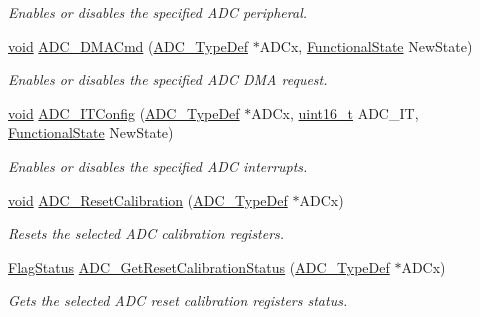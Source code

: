\begin{DoxyCompactItemize}
\begin{DoxyCompactList}\small\item\em Enables or disables the specified A\+DC peripheral. \end{DoxyCompactList}\item 
\hyperlink{usb__devapi_8h_afabf60e7f57651d6d595a02c75f07cd0}{void} \hyperlink{group___a_d_c___private___functions_gac5881d5995818001584b27b137a8dbcb}{A\+D\+C\+\_\+\+D\+M\+A\+Cmd} (\hyperlink{struct_a_d_c___type_def}{A\+D\+C\+\_\+\+Type\+Def} $\ast$A\+D\+Cx, \hyperlink{agilefox_2library_2inc_2stm32f10x__type_8h_ac9a7e9a35d2513ec15c3b537aaa4fba1}{Functional\+State} New\+State)
\begin{DoxyCompactList}\small\item\em Enables or disables the specified A\+DC D\+MA request. \end{DoxyCompactList}\item 
\hyperlink{usb__devapi_8h_afabf60e7f57651d6d595a02c75f07cd0}{void} \hyperlink{group___a_d_c___private___functions_gad4c84b54b539944f555488bf979f82b6}{A\+D\+C\+\_\+\+I\+T\+Config} (\hyperlink{struct_a_d_c___type_def}{A\+D\+C\+\_\+\+Type\+Def} $\ast$A\+D\+Cx, \hyperlink{_p_e___types_8h_a1f1825b69244eb3ad2c7165ddc99c956}{uint16\+\_\+t} A\+D\+C\+\_\+\+IT, \hyperlink{agilefox_2library_2inc_2stm32f10x__type_8h_ac9a7e9a35d2513ec15c3b537aaa4fba1}{Functional\+State} New\+State)
\begin{DoxyCompactList}\small\item\em Enables or disables the specified A\+DC interrupts. \end{DoxyCompactList}\item 
\hyperlink{usb__devapi_8h_afabf60e7f57651d6d595a02c75f07cd0}{void} \hyperlink{group___a_d_c___private___functions_ga3d542020ba28c1d16238a0defbee6d8f}{A\+D\+C\+\_\+\+Reset\+Calibration} (\hyperlink{struct_a_d_c___type_def}{A\+D\+C\+\_\+\+Type\+Def} $\ast$A\+D\+Cx)
\begin{DoxyCompactList}\small\item\em Resets the selected A\+DC calibration registers. \end{DoxyCompactList}\item 
\hyperlink{agilefox_2library_2inc_2stm32f10x__type_8h_a89136caac2e14c55151f527ac02daaff}{Flag\+Status} \hyperlink{group___a_d_c___private___functions_ga113be9fe25add8d7496bed659c68e02b}{A\+D\+C\+\_\+\+Get\+Reset\+Calibration\+Status} (\hyperlink{struct_a_d_c___type_def}{A\+D\+C\+\_\+\+Type\+Def} $\ast$A\+D\+Cx)
\begin{DoxyCompactList}\small\item\em Gets the selected A\+DC reset calibration registers status. \end{DoxyCompactList}\item 

\end{DoxyCompactItemize}
